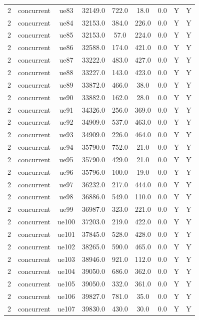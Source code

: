 \begin{table}[ht]
\begin{tabular}{|c|c|c|c|c|c|c|c|c|}
2 & concurrent & ue83 & 32149.0 & 722.0 & 18.0 & 0.0 & Y & Y \\
2 & concurrent & ue84 & 32153.0 & 384.0 & 226.0 & 0.0 & Y & Y \\
2 & concurrent & ue85 & 32153.0 & 57.0 & 224.0 & 0.0 & Y & Y \\
2 & concurrent & ue86 & 32588.0 & 174.0 & 421.0 & 0.0 & Y & Y \\
2 & concurrent & ue87 & 33222.0 & 483.0 & 427.0 & 0.0 & Y & Y \\
2 & concurrent & ue88 & 33227.0 & 143.0 & 423.0 & 0.0 & Y & Y \\
2 & concurrent & ue89 & 33872.0 & 466.0 & 38.0 & 0.0 & Y & Y \\
2 & concurrent & ue90 & 33882.0 & 162.0 & 28.0 & 0.0 & Y & Y \\
2 & concurrent & ue91 & 34326.0 & 256.0 & 369.0 & 0.0 & Y & Y \\
2 & concurrent & ue92 & 34909.0 & 537.0 & 463.0 & 0.0 & Y & Y \\
2 & concurrent & ue93 & 34909.0 & 226.0 & 464.0 & 0.0 & Y & Y \\
2 & concurrent & ue94 & 35790.0 & 752.0 & 21.0 & 0.0 & Y & Y \\
2 & concurrent & ue95 & 35790.0 & 429.0 & 21.0 & 0.0 & Y & Y \\
2 & concurrent & ue96 & 35796.0 & 100.0 & 19.0 & 0.0 & Y & Y \\
2 & concurrent & ue97 & 36232.0 & 217.0 & 444.0 & 0.0 & Y & Y \\
2 & concurrent & ue98 & 36886.0 & 549.0 & 110.0 & 0.0 & Y & Y \\
2 & concurrent & ue99 & 36987.0 & 323.0 & 221.0 & 0.0 & Y & Y \\
2 & concurrent & ue100 & 37203.0 & 219.0 & 422.0 & 0.0 & Y & Y \\
2 & concurrent & ue101 & 37845.0 & 528.0 & 428.0 & 0.0 & Y & Y \\
2 & concurrent & ue102 & 38265.0 & 590.0 & 465.0 & 0.0 & Y & Y \\
2 & concurrent & ue103 & 38946.0 & 921.0 & 112.0 & 0.0 & Y & Y \\
2 & concurrent & ue104 & 39050.0 & 686.0 & 362.0 & 0.0 & Y & Y \\
2 & concurrent & ue105 & 39050.0 & 332.0 & 361.0 & 0.0 & Y & Y \\
2 & concurrent & ue106 & 39827.0 & 781.0 & 35.0 & 0.0 & Y & Y \\
2 & concurrent & ue107 & 39830.0 & 430.0 & 30.0 & 0.0 & Y & Y \\

\end{tabular}
\end{table}

